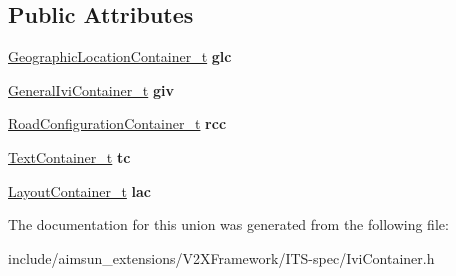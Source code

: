 \subsection*{Public Attributes}
\begin{DoxyCompactItemize}
\item 
\hyperlink{structGeographicLocationContainer}{Geographic\+Location\+Container\+\_\+t} {\bfseries glc}\hypertarget{unionIviContainer_1_1IviContainer__u_a0e8b51a38583684af50b86858b4c4fd0}{}\label{unionIviContainer_1_1IviContainer__u_a0e8b51a38583684af50b86858b4c4fd0}

\item 
\hyperlink{structGeneralIviContainer}{General\+Ivi\+Container\+\_\+t} {\bfseries giv}\hypertarget{unionIviContainer_1_1IviContainer__u_a15c4b410d1423d0953f45e081d596714}{}\label{unionIviContainer_1_1IviContainer__u_a15c4b410d1423d0953f45e081d596714}

\item 
\hyperlink{structRoadConfigurationContainer}{Road\+Configuration\+Container\+\_\+t} {\bfseries rcc}\hypertarget{unionIviContainer_1_1IviContainer__u_a37429f56659ecf512064c8c5eddcecf2}{}\label{unionIviContainer_1_1IviContainer__u_a37429f56659ecf512064c8c5eddcecf2}

\item 
\hyperlink{structTextContainer}{Text\+Container\+\_\+t} {\bfseries tc}\hypertarget{unionIviContainer_1_1IviContainer__u_acb7a1aefdf9fb86690d25415bf38bf45}{}\label{unionIviContainer_1_1IviContainer__u_acb7a1aefdf9fb86690d25415bf38bf45}

\item 
\hyperlink{structLayoutContainer}{Layout\+Container\+\_\+t} {\bfseries lac}\hypertarget{unionIviContainer_1_1IviContainer__u_aba5e6047b905251e011daeb9cfb95ff8}{}\label{unionIviContainer_1_1IviContainer__u_aba5e6047b905251e011daeb9cfb95ff8}

\end{DoxyCompactItemize}


The documentation for this union was generated from the following file\+:\begin{DoxyCompactItemize}
\item 
include/aimsun\+\_\+extensions/\+V2\+X\+Framework/\+I\+T\+S-\/spec/Ivi\+Container.\+h\end{DoxyCompactItemize}
